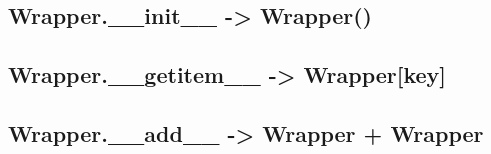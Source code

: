 \subsection{Wrapper.\_\_init\_\_ -> Wrapper()} \label{subchapter:wrapper.__init__}
    

\subsection{Wrapper.\_\_getitem\_\_ -> Wrapper[key]} \label{subchapter:wrapper.__getitem__}
    

\subsection{Wrapper.\_\_add\_\_ -> Wrapper + Wrapper} \label{subchapter:wrapper.__add__}
    